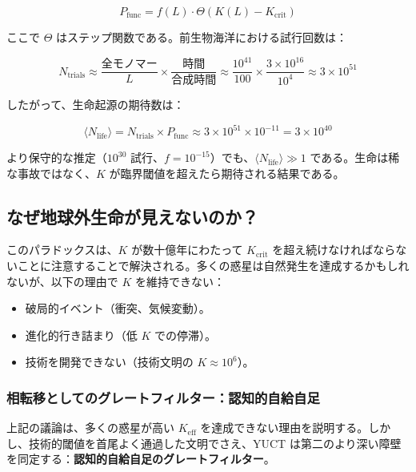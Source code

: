 \documentclass[12pt,a4paper]{article}
\newcommand{\Keffcrit}{K_{\mathrm{crit}}}
\newcommand{\Ntrials}{N_{\mathrm{trials}}}
\newcommand{\Nlife}{\langle N_{\mathrm{life}}\rangle}
\theoremstyle{remark}
\begin{document}
	\begin{equation}
		P_{\text{func}} = f(L) \cdot \Theta(K(L) - K_{\text{crit}})
		\label{eq:Pfunc}
	\end{equation}
	
	ここで \(\Theta\) はステップ関数である。前生物海洋における試行回数は：
	
	\begin{equation}
		\Ntrials \approx \frac{\text{全モノマー}}{L} \times \frac{\text{時間}}{\text{合成時間}} \approx \frac{10^{41}}{100} \times \frac{3\times 10^{16}}{10^4} \approx 3 \times 10^{51}
		\label{eq:trials}
	\end{equation}
	
	したがって、生命起源の期待数は：
	
	\begin{equation}
		\Nlife = \Ntrials \times P_{\text{func}} \approx 3 \times 10^{51} \times 10^{-11} = 3 \times 10^{40}
		\label{eq:Nlife}
	\end{equation}
	
	より保守的な推定（\(10^{30}\) 試行、\(f=10^{-15}\)）でも、\(\Nlife \gg 1\) である。生命は稀な事故ではなく、\(K\) が臨界閾値を超えたら期待される結果である。
	
	\subsection{なぜ地球外生命が見えないのか？}
	
	このパラドックスは、\(K\) が数十億年にわたって \(\Keffcrit\) を超え続けなければならないことに注意することで解決される。多くの惑星は自然発生を達成するかもしれないが、以下の理由で \(K\) を維持できない：
	
	\begin{itemize}
		\item 破局的イベント（衝突、気候変動）。
		\item 進化的行き詰まり（低 \(K\) での停滞）。
		\item 技術を開発できない（技術文明の \(K \approx 10^6\)）。
	\end{itemize}
	
	\subsubsection*{相転移としてのグレートフィルター：認知的自給自足}
	
	上記の議論は、多くの惑星が高い \(K_{\mathrm{eff}}\) を達成できない理由を説明する。しかし、技術的閾値を首尾よく通過した文明でさえ、YUCT は第二のより深い障壁を同定する：\textbf{認知的自給自足のグレートフィルター}。
	
\end{document}
